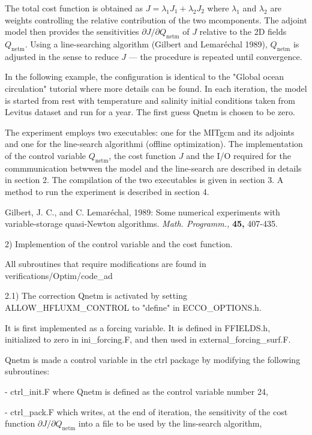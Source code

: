 The total cost function is obtained as $J=\lambda_1 J_1+ \lambda_2 J_2$ where
$\lambda_1$ and $\lambda_2$ are weights controlling the relative contribution
of the two mcomponents. The adjoint model then provides the sensitivities
$\partial J/\partial Q_\mathrm{netm}$ of $J$ relative to the 2D fields
$Q_\mathrm{netm}$. Using a line-searching algorithm (Gilbert and Lemar\'{e}chal 1989),
$Q_\mathrm{netm}$ is adjusted in the sense to reduce $J$ --- the procedure is 
repeated until convergence.

In the following example, the configuration is identical to the "Global ocean circulation"
tutorial where more details can be found. In each iteration, the model is started from
rest with temperature and salinity initial conditions taken from Levitus dataset and run
for a year. The first guess Qnetm is chosen to be zero.

The experiment employs two executables: one for the MITgcm and its adjoints and 
one for the line-search algorithmi (offline optimization). The implementation of
the control variable $Q_\mathrm{netm}$, the cost function $J$ and the I/O required
for the commmunication betwwen the model and the line-search are described in details 
in section 2. The compilation of the two executables is given in section 3.
 A method to run the experiment is described in section 4.

Gilbert, J. C., and C. Lemar\'echal, 1989: Some numerical experiments with
variable-storage quasi-Newton algorithms. \textit{Math. Programm.,}
\textbf{45,} 407-435.

2) Implemention of the control variable and the cost function.

All subroutines that require modifications are found in verifications/Optim/code\_ad

2.1) The correction Qnetm is activated by setting ALLOW\_HFLUXM\_CONTROL to "define" in ECCO\_OPTIONS.h.

It is first implemented as a forcing variable. It is defined in FFIELDS.h,
initialized to zero in ini\_forcing.F, and then used in external\_forcing\_surf.F.

Qnetm is made a control variable in the ctrl package by modifying the following subroutines:

- ctrl\_init.F where Qnetm is defined as the control variable number 24,

- ctrl\_pack.F which writes, at the end of iteration, the sensitivity of the cost function
$\partial J/\partial Q_\mathrm{netm}$ into a file to be used by the lins-search algorithm,

